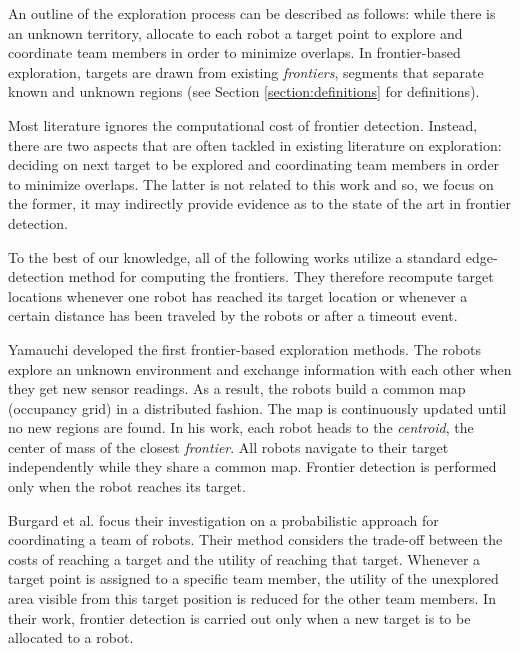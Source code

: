 An outline of the exploration process can be described as follows: while there
is an unknown territory, allocate to each robot a target point to explore and
coordinate team members in order to minimize overlaps. In frontier-based exploration,
targets are drawn from existing \emph{frontiers}, segments that separate known
and unknown regions (see Section \ref{section:definitions} for definitions).

Most literature ignores the computational cost of frontier detection. 
Instead, there are two aspects that are often tackled in existing literature on
exploration: deciding on next target to be explored and coordinating team
members in order to minimize overlaps. The latter is not related to this work
and so, we focus on the former, it may indirectly provide
evidence as to the state of the art in frontier detection.

To the best of our knowledge, all of the following works utilize a standard
edge-detection method for computing the frontiers. They therefore recompute
target locations whenever one robot has reached its target location or whenever
a certain distance has been traveled by the robots or after a timeout event.

Yamauchi \cite{yamauchi_frontier-based_1997,yamauchi_frontier-based_1998}
developed the first frontier-based exploration methods. The robots explore an
unknown environment and exchange information with each other when they get new
sensor readings. As a result, the robots build a common map (occupancy grid) in
a distributed fashion. The map is continuously updated until no new regions are
found. In his work, each robot heads to the \emph{centroid}, the center of mass
of the closest \emph{frontier}. All robots navigate to their target
independently while they share a common map. Frontier detection is performed
only when the robot reaches its target.

Burgard et al. \cite{burgard_collaborative_2000,burgard05tro} focus their
investigation on a probabilistic approach for coordinating a team of robots.
Their method considers the trade-off between the costs of reaching a target and the
utility of reaching that target. Whenever a target point is assigned to a
specific team member, the utility of the unexplored area visible from this
target position is reduced for the other team members. In their work, frontier
detection is carried out only when a new target is to be allocated to a robot.


